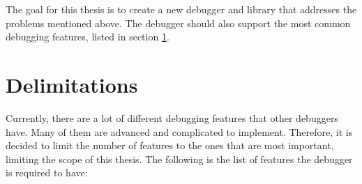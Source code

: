 The goal for this thesis is to create a new debugger and library that addresses the problems mentioned above.
The debugger should also support the most common debugging features, listed in section \ref{sec:delimitations}.









\section{Delimitations}
\label{sec:delimitations}




Currently, there are a lot of different debugging features that other debuggers have.
Many of them are advanced and complicated to implement.
Therefore, it is decided to limit the number of features to the ones that are most important, limiting the scope of this thesis.
The following is the list of features the debugger is required to have:


